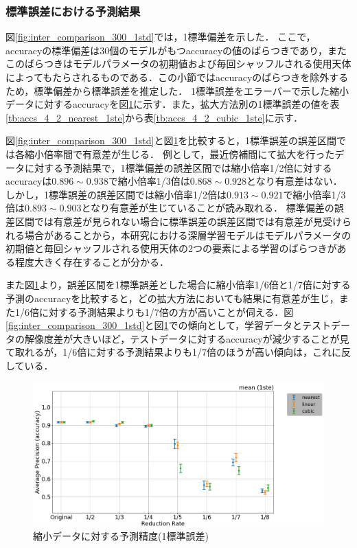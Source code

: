 \documentclass[a4j, 11pt]{jreport}
\begin{document}
\subsubsection{標準誤差における予測結果}
図\ref{fig:inter_comparison_300_1std}では，1標準偏差を示した．
ここで，accuracyの標準偏差は30個のモデルがもつaccuracyの値のばらつきであり，またこのばらつきはモデルパラメータの初期値および毎回シャッフルされる使用天体によってもたらされるものである．この小節ではaccuracyのばらつきを除外するため，標準偏差から標準誤差を推定した．
1標準誤差をエラーバーで示した縮小データに対するaccuracyを図\ref{fig:inter_comparison_300_1ste}に示す．また，拡大方法別の1標準誤差の値を表\ref{tb:accs_4_2_nearest_1ste}から表\ref{tb:accs_4_2_cubic_1ste}に示す．

図\ref{fig:inter_comparison_300_1std}と図\ref{fig:inter_comparison_300_1ste}を比較すると，1標準誤差の誤差区間では各縮小倍率間で有意差が生じる．
例として，最近傍補間にて拡大を行ったデータに対する予測結果で，1標準偏差の誤差区間では縮小倍率1/2倍に対するaccuracyは$0.896 \sim 0.938$で縮小倍率1/3倍は$0.868 \sim 0.928$となり有意差はない．しかし，1標準誤差の誤差区間では縮小倍率1/2倍は$0.913 \sim 0.921$で縮小倍率1/3倍は$0.893 \sim 0.903$となり有意差が生じていることが読み取れる．
標準偏差の誤差区間では有意差が見られない場合に標準誤差の誤差区間では有意差が見受けられる場合があることから，本研究における深層学習モデルはモデルパラメータの初期値と毎回シャッフルされる使用天体の2つの要素による学習のばらつきがある程度大きく存在することが分かる．

また図\ref{fig:inter_comparison_300_1ste}より，誤差区間を1標準誤差とした場合に縮小倍率1/6倍と1/7倍に対する予測のaccuracyを比較すると，どの拡大方法においても結果に有意差が生じ，また1/6倍に対する予測結果よりも1/7倍の方が高いことが伺える．図\ref{fig:inter_comparison_300_1std}と図\ref{fig:inter_comparison_300_1ste}での傾向として，学習データとテストデータの解像度差が大きいほど，テストデータに対するaccuracyが減少することが見て取れるが，1/6倍に対する予測結果よりも1/7倍のほうが高い傾向は，これに反している．

\begin{figure}[H]
  \centering
  \includegraphics[width=16cm]{images/5syou/print_errorbar/print_errorbar_inter_comparison/acc_with_errorbar_syuron5_inter_comparison_900epoch_30run_300_acc_max_ste1sigma.png}
  \caption{縮小データに対する予測精度(1標準誤差)}
  \label{fig:inter_comparison_300_1ste}
\end{figure}
\end{document}

